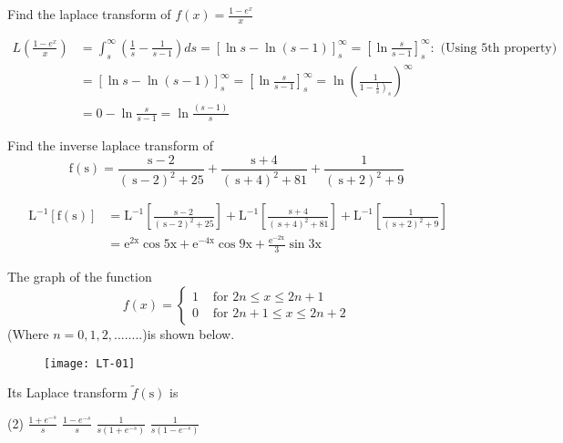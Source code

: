\begin{exercise}
	Find the laplace transform of $f(x)=\frac{1-e^{x}}{x}$
\end{exercise}
\begin{answer}
	\begin{align*}
	L\left(\frac{1-e^{x}}{x}\right)&=\int_{s}^{\infty}\left(\frac{1}{s}-\frac{1}{s-1}\right) d s=[\ln s-\ln (s-1)]_{s}^{\infty}=\left[\ln \frac{s}{s-1}\right]_{s}^{\infty}:\text{ (Using 5th property)}\\
	&=[\ln s-\ln (s-1)]_{s}^{\infty}=\left[\ln \frac{s}{s-1}\right]_{s}^{\infty}=\ln \left(\frac{1}{\left.1-\frac{1}{s}\right)_{s}}\right)^{\infty} \\
	&=0-\ln \frac{s}{s-1}=\ln \frac{(s-1)}{s}
	\end{align*}
\end{answer}
\begin{exercise}
	Find the inverse laplace transform of
	$$\mathrm{f}(\mathrm{s}) =\frac{\mathrm{s}-2}{(\mathrm{~s}-2)^{2}+25}+\frac{\mathrm{s}+4}{(\mathrm{~s}+4)^{2}+81}+\frac{1}{(\mathrm{~s}+2)^{2}+9} $$
\end{exercise}
\begin{answer}
	\begin{align*}
	\mathrm{~L}^{-1}[\mathrm{f}(\mathrm{s})] &=\mathrm{L}^{-1}\left[\frac{\mathrm{s}-2}{(\mathrm{~s}-2)^{2}+25}\right]+\mathrm{L}^{-1}\left[\frac{\mathrm{s}+4}{(\mathrm{~s}+4)^{2}+81}\right]+\mathrm{L}^{-1}\left[\frac{1}{(\mathrm{~s}+2)^{2}+9}\right] \\
	&=\mathrm{e}^{2 \mathrm{x}} \cos 5 \mathrm{x}+\mathrm{e}^{-4 \mathrm{x}} \cos 9 \mathrm{x}+\frac{\mathrm{e}^{-2 \mathrm{x}}}{3} \sin 3 \mathrm{x}
	\end{align*}
\end{answer}
\begin{exercise}
	The graph of the function
	$$f(x)= \begin{cases}1 & \text { for } 2 n \leq x \leq 2 n+1 \\ 0 & \text { for } 2 n+1 \leq x \leq 2 n+2\end{cases}$$
	(Where $n=0,1,2,........$)is shown below.
	\begin{figure}[H]
		\centering
		\texttt{[image: LT-01]}
	\end{figure}
	Its Laplace transform $\tilde{f}(\mathrm{s})$ is
	\begin{tasks}(2)
		\task[\textbf{a.}]$\frac{1+e^{-s}}{s}$
		\task[\textbf{b.}]$\frac{1-e^{-s}}{s}$
		\task[\textbf{c.}]$\frac{1}{s\left(1+e^{-s}\right)}$
		\task[\textbf{d.}]  $\frac{1}{s\left(1-e^{-s}\right)}$
	\end{tasks}
\end{exercise}
